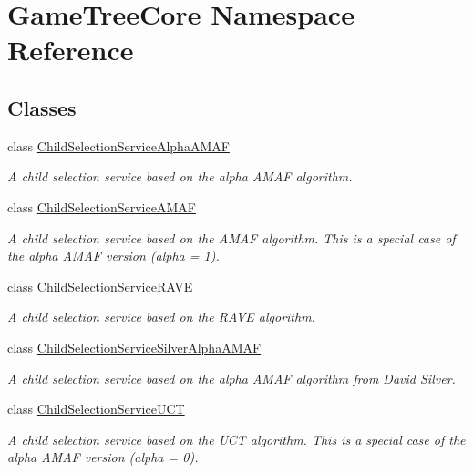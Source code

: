 \hypertarget{namespace_game_tree_core}{}\section{Game\+Tree\+Core Namespace Reference}
\label{namespace_game_tree_core}
\subsection*{Classes}
\begin{DoxyCompactItemize}
\item 
class \mbox{\hyperlink{class_game_tree_core_1_1_child_selection_service_alpha_a_m_a_f}{Child\+Selection\+Service\+Alpha\+A\+M\+AF}}
\begin{DoxyCompactList}\small\item\em A child selection service based on the alpha A\+M\+AF algorithm. \end{DoxyCompactList}\item 
class \mbox{\hyperlink{class_game_tree_core_1_1_child_selection_service_a_m_a_f}{Child\+Selection\+Service\+A\+M\+AF}}
\begin{DoxyCompactList}\small\item\em A child selection service based on the A\+M\+AF algorithm. This is a special case of the alpha A\+M\+AF version (alpha = 1). \end{DoxyCompactList}\item 
class \mbox{\hyperlink{class_game_tree_core_1_1_child_selection_service_r_a_v_e}{Child\+Selection\+Service\+R\+A\+VE}}
\begin{DoxyCompactList}\small\item\em A child selection service based on the R\+A\+VE algorithm. \end{DoxyCompactList}\item 
class \mbox{\hyperlink{class_game_tree_core_1_1_child_selection_service_silver_alpha_a_m_a_f}{Child\+Selection\+Service\+Silver\+Alpha\+A\+M\+AF}}
\begin{DoxyCompactList}\small\item\em A child selection service based on the alpha A\+M\+AF algorithm from David Silver. \end{DoxyCompactList}\item 
class \mbox{\hyperlink{class_game_tree_core_1_1_child_selection_service_u_c_t}{Child\+Selection\+Service\+U\+CT}}
\begin{DoxyCompactList}\small\item\em A child selection service based on the U\+CT algorithm. This is a special case of the alpha A\+M\+AF version (alpha = 0). \end{DoxyCompactList}\item 

\end{DoxyCompactItemize}
